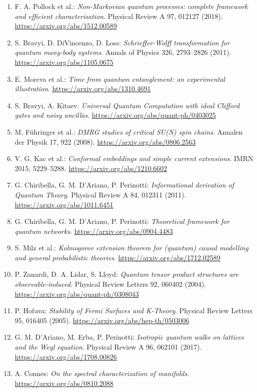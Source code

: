 \begin{enumerate}[label={E\arabic*.},leftmargin=2.4em,itemsep=7pt]
\item F. A. Pollock et al.: \emph{Non-Markovian quantum processes: complete framework and efficient characterisation}. Physical Review A 97, 012127 (2018). \url{https://arxiv.org/abs/1512.00589}
\item S. Bravyi, D. DiVincenzo, D. Loss: \emph{Schrieffer-Wolff transformation for quantum many-body systems}. Annals of Physics 326, 2793--2826 (2011). \url{https://arxiv.org/abs/1105.0675}
\item E. Moreva et al.: \emph{Time from quantum entanglement: an experimental illustration}. \url{https://arxiv.org/abs/1310.4691}
\item S. Bravyi, A. Kitaev: \emph{Universal Quantum Computation with ideal Clifford gates and noisy ancillas}. \url{https://arxiv.org/abs/quant-ph/0403025}
\item M. Führinger et al.: \emph{DMRG studies of critical SU(N) spin chains}. Annalen der Physik 17, 922 (2008). \url{https://arxiv.org/abs/0806.2563}
\item V. G. Kac et al.: \emph{Conformal embeddings and simple current extensions}. IMRN 2015, 5229--5288. \url{https://arxiv.org/abs/1210.6602}
\item G. Chiribella, G. M. D'Ariano, P. Perinotti: \emph{Informational derivation of Quantum Theory}. Physical Review A 84, 012311 (2011). \url{https://arxiv.org/abs/1011.6451}
\item G. Chiribella, G. M. D'Ariano, P. Perinotti: \emph{Theoretical framework for quantum networks}. \url{https://arxiv.org/abs/0904.4483}
\item S. Milz et al.: \emph{Kolmogorov extension theorem for (quantum) causal modelling and general probabilistic theories}. \url{https://arxiv.org/abs/1712.02589}
\item P. Zanardi, D. A. Lidar, S. Lloyd: \emph{Quantum tensor product structures are observable-induced}. Physical Review Letters 92, 060402 (2004). \url{https://arxiv.org/abs/quant-ph/0308043}
\item P. Hořava: \emph{Stability of Fermi Surfaces and K-Theory}. Physical Review Letters 95, 016405 (2005). \url{https://arxiv.org/abs/hep-th/0503006}
\item G. M. D'Ariano, M. Erba, P. Perinotti: \emph{Isotropic quantum walks on lattices and the Weyl equation}. Physical Review A 96, 062101 (2017). \url{https://arxiv.org/abs/1708.00826}
\item A. Connes: \emph{On the spectral characterization of manifolds}. \url{https://arxiv.org/abs/0810.2088}

\end{enumerate}
